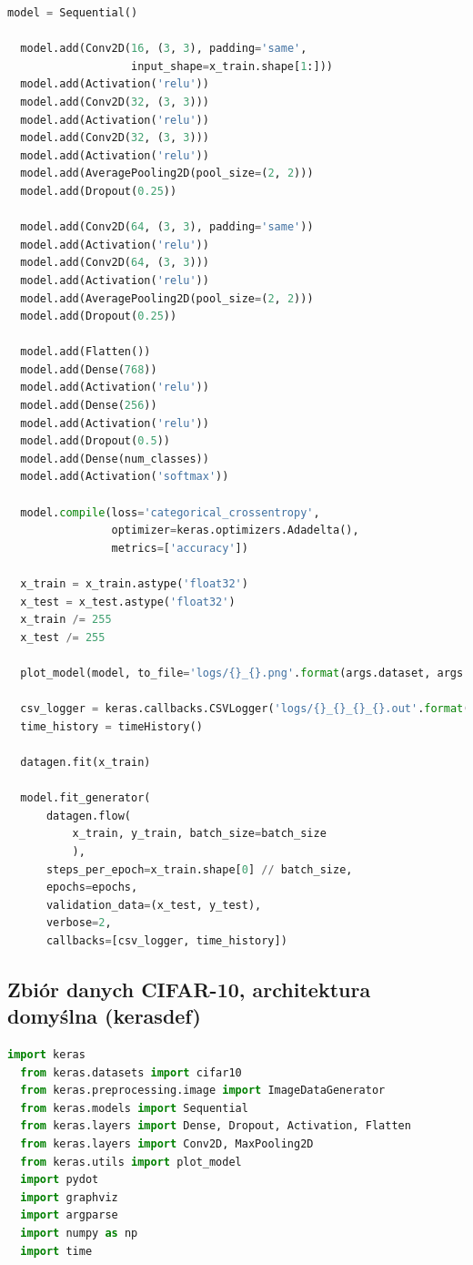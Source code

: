 \documentclass[12pt,a4paper,twoside]{article}
\begin{document}
\begin{appendices}
\begin{lstlisting}[language=python]
  model = Sequential()

  model.add(Conv2D(16, (3, 3), padding='same',
                   input_shape=x_train.shape[1:]))
  model.add(Activation('relu'))
  model.add(Conv2D(32, (3, 3)))
  model.add(Activation('relu'))
  model.add(Conv2D(32, (3, 3)))
  model.add(Activation('relu'))
  model.add(AveragePooling2D(pool_size=(2, 2)))
  model.add(Dropout(0.25))

  model.add(Conv2D(64, (3, 3), padding='same'))
  model.add(Activation('relu'))
  model.add(Conv2D(64, (3, 3)))
  model.add(Activation('relu'))
  model.add(AveragePooling2D(pool_size=(2, 2)))
  model.add(Dropout(0.25))

  model.add(Flatten())
  model.add(Dense(768))
  model.add(Activation('relu'))
  model.add(Dense(256))
  model.add(Activation('relu'))
  model.add(Dropout(0.5))
  model.add(Dense(num_classes))
  model.add(Activation('softmax'))

  model.compile(loss='categorical_crossentropy',
                optimizer=keras.optimizers.Adadelta(),
                metrics=['accuracy'])

  x_train = x_train.astype('float32')
  x_test = x_test.astype('float32')
  x_train /= 255
  x_test /= 255

  plot_model(model, to_file='logs/{}_{}.png'.format(args.dataset, args.architecture))

  csv_logger = keras.callbacks.CSVLogger('logs/{}_{}_{}_{}.out'.format(args.run_date, args.dataset, args.architecture, args.instance_type))
  time_history = timeHistory()

  datagen.fit(x_train)

  model.fit_generator(
      datagen.flow(
          x_train, y_train, batch_size=batch_size
          ),
      steps_per_epoch=x_train.shape[0] // batch_size,
      epochs=epochs,
      validation_data=(x_test, y_test),
      verbose=2,
      callbacks=[csv_logger, time_history])
\end{lstlisting}
\clearpage
\subsection{Zbiór danych CIFAR-10, architektura domyślna (kerasdef)}
\begin{lstlisting}[language=python]
  import keras
  from keras.datasets import cifar10
  from keras.preprocessing.image import ImageDataGenerator
  from keras.models import Sequential
  from keras.layers import Dense, Dropout, Activation, Flatten
  from keras.layers import Conv2D, MaxPooling2D
  from keras.utils import plot_model
  import pydot
  import graphviz
  import argparse
  import numpy as np
  import time


\end{lstlisting}
\end{appendices}
\end{document}
